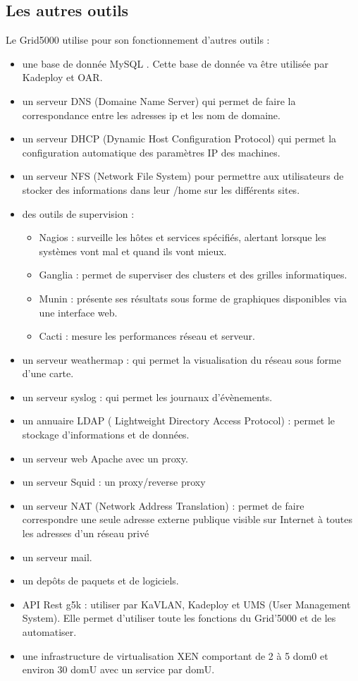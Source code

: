 \documentclass[a4paper, 10pt, onecolumn]{report}
\begin{document}
		\subsection{Les autres outils}
			Le Grid5000 utilise pour son fonctionnement d'autres outils :
				\begin{itemize}
					\item une base de donnée MySQL . Cette base de donnée va \^etre utilisée par Kadeploy et OAR.
					\item un serveur DNS (Domaine Name Server) qui permet de faire la correspondance entre les adresses ip et les nom de domaine.			
					\item un serveur DHCP (Dynamic Host Configuration Protocol) qui permet la configuration automatique des paramètres IP des machines.
					\item un serveur NFS (Network File System) pour permettre aux utilisateurs de stocker des informations dans leur /home sur les
 différents sites.
 					\item des  outils de supervision : \begin{itemize}
 															\item 	Nagios : surveille les hôtes et services spécifiés, alertant lorsque les systèmes vont mal et quand ils vont mieux.
 															\item 	Ganglia : permet de superviser des clusters et des grilles informatiques. 
 															\item 	Munin : présente ses résultats sous forme de graphiques disponibles via une interface web.
 															\item 	Cacti : mesure les performances réseau et serveur.
 														\end{itemize}
 					\item un serveur weathermap : qui permet la visualisation du réseau sous forme d'une carte.
 					\item un serveur syslog : qui permet les journaux d'évènements.
 					\item un annuaire LDAP ( Lightweight Directory Access Protocol) : permet le stockage d'informations et de données.
 					\item un serveur web Apache avec un proxy.
 					\item un serveur Squid :  un proxy/reverse proxy
 					\item un serveur NAT (Network Address Translation) : permet de faire correspondre une seule adresse externe publique visible sur Internet à toutes les adresses d'un réseau privé
 					\item un serveur mail.
 					\item un dep\^ots de paquets et de logiciels.
 					\item API Rest g5k : utiliser par KaVLAN, Kadeploy et UMS (User Management System). Elle permet d'utiliser toute les fonctions du Grid'5000 et de les automatiser.
 					\item une infrastructure de virtualisation XEN comportant de 2 à 5 dom0 et environ 30 domU avec un service par domU.
 					
				\end{itemize}
\end{document}
